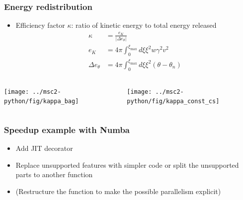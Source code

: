 \begin{frame}
    \frametitle{Energy redistribution}
    \begin{itemize}
        \item Efficiency factor $\kappa$: ratio of kinetic energy to total energy released
        \begin{align}
            \kappa &= \frac{e_K}{|\Delta e_\theta|} \\
            e_K &= 4 \pi \int_0^{\xi_\text{max}} d\xi \xi^2 w \gamma^2 v^2 \\
            \Delta e_{\theta} &= 4 \pi \int_0^{\xi_\text{max}} d\xi \xi^2 (\theta - \theta_n)
        \end{align}
    \end{itemize}
    \begin{columns}
    \begin{column}{0.35\textwidth}
        \texttt{[image: ../msc2-python/fig/kappa\_bag]}
    \end{column}
    \begin{column}{0.35\textwidth}
        \texttt{[image: ../msc2-python/fig/kappa\_const\_cs]}
    \end{column}
    \end{columns}
\end{frame}

\begin{frame}
    \frametitle{Speedup example with Numba}
    \begin{itemize}
        \item Add JIT decorator
        \item Replace unsupported features with simpler code or split the unsupported parts to another function
        \item (Restructure the function to make the possible parallelism explicit)
    \end{itemize}
    {
        \scriptsize
        
    }
\end{frame}
